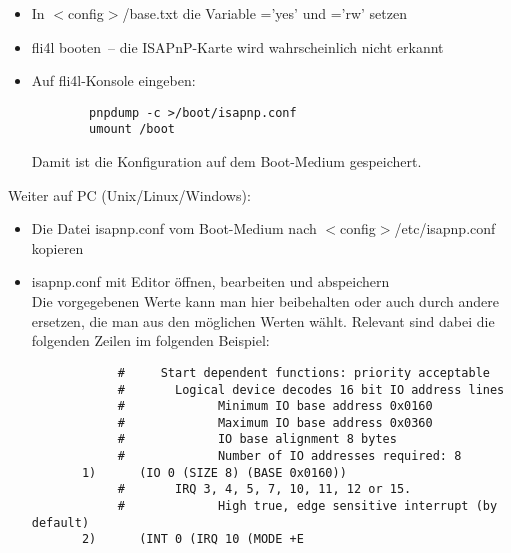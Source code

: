   \begin{itemize}
  \item In $<$config$>$/base.txt die Variable ='yes' und
    ='rw' setzen
  \item fli4l booten~-- die ISAPnP-Karte wird wahrscheinlich nicht erkannt
  \item Auf fli4l-Konsole eingeben:
\begin{example}
\begin{verbatim}
        pnpdump -c >/boot/isapnp.conf
        umount /boot
\end{verbatim}
\end{example}
    Damit ist die Konfiguration auf dem Boot-Medium gespeichert.
  \end{itemize}
  Weiter auf PC (Unix/Linux/Windows):
  \begin{itemize}
  \item Die Datei isapnp.conf vom Boot-Medium nach $<$config$>$/etc/isapnp.conf
    kopieren
  \item isapnp.conf mit Editor öffnen, bearbeiten und abspeichern\\
        Die vorgegebenen Werte kann man hier beibehalten oder auch
        durch andere ersetzen, die man aus den möglichen Werten wählt.
        Relevant sind dabei die folgenden Zeilen im folgenden Beispiel:

\begin{example}
\begin{verbatim}
            #     Start dependent functions: priority acceptable
            #       Logical device decodes 16 bit IO address lines
            #             Minimum IO base address 0x0160
            #             Maximum IO base address 0x0360
            #             IO base alignment 8 bytes
            #             Number of IO addresses required: 8
       1)      (IO 0 (SIZE 8) (BASE 0x0160))
            #       IRQ 3, 4, 5, 7, 10, 11, 12 or 15.
            #             High true, edge sensitive interrupt (by default)
       2)      (INT 0 (IRQ 10 (MODE +E
\end{verbatim}
\end{example}

\end{itemize}
